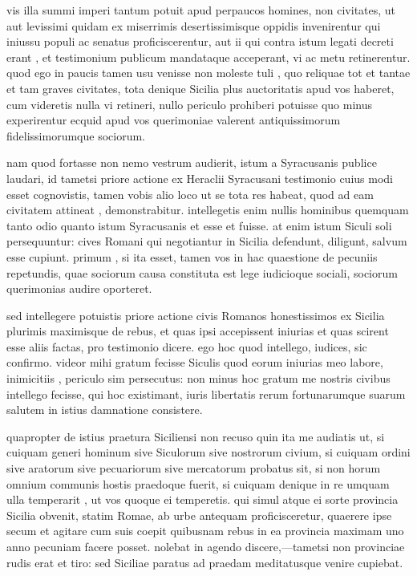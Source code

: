  vis illa summi imperi tantum potuit apud perpaucos homines, non civitates, ut aut levissimi quidam ex miserrimis desertissimisque oppidis invenirentur qui iniussu populi ac senatus proficiscerentur, aut ii qui contra istum legati decreti erant , et testimonium publicum mandataque acceperant, vi ac metu retinerentur. quod ego in paucis tamen usu venisse non moleste tuli , quo reliquae tot et tantae et tam graves civitates, tota denique Sicilia plus auctoritatis apud vos haberet, cum videretis nulla vi retineri, nullo periculo prohiberi potuisse quo minus experirentur ecquid apud vos querimoniae valerent antiquissimorum fidelissimorumque sociorum.

 nam quod fortasse non nemo vestrum audierit, istum a Syracusanis publice laudari, id tametsi priore actione ex Heraclii Syracusani testimonio cuius modi esset cognovistis, tamen vobis alio loco ut se tota res habeat, quod ad eam civitatem attineat , demonstrabitur. intellegetis enim nullis hominibus quemquam tanto odio quanto istum Syracusanis et esse et fuisse. at enim istum Siculi soli persequuntur: cives Romani qui negotiantur in Sicilia defendunt, diligunt, salvum esse cupiunt. primum , si ita esset, tamen vos in hac quaestione de pecuniis repetundis, quae sociorum causa constituta est lege iudicioque sociali, sociorum querimonias audire oporteret.

 sed intellegere potuistis priore actione civis Romanos honestissimos ex Sicilia plurimis maximisque de rebus, et quas ipsi accepissent iniurias et quas scirent esse aliis factas, pro testimonio dicere. ego hoc quod intellego, iudices, sic confirmo. videor mihi gratum fecisse Siculis quod eorum iniurias meo labore, inimicitiis , periculo sim persecutus: non minus hoc gratum me nostris civibus intellego fecisse, qui hoc existimant, iuris libertatis rerum fortunarumque suarum salutem in istius damnatione consistere.

 quapropter de istius praetura Siciliensi non recuso quin ita me audiatis ut, si cuiquam generi hominum sive Siculorum sive nostrorum civium, si cuiquam ordini sive aratorum sive pecuariorum sive mercatorum probatus sit, si non horum omnium communis hostis praedoque fuerit, si cuiquam denique in re umquam ulla temperarit , ut vos quoque ei temperetis. qui simul atque ei sorte provincia Sicilia obvenit, statim Romae, ab urbe antequam proficisceretur, quaerere ipse secum et agitare cum suis coepit quibusnam rebus in ea provincia maximam uno anno pecuniam facere posset. nolebat in agendo discere,—tametsi non provinciae rudis erat et tiro: sed Siciliae paratus ad praedam meditatusque venire cupiebat.

